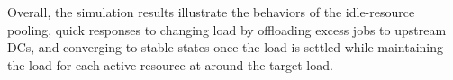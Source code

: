 

Overall, the simulation results illustrate the behaviors of the
idle-resource pooling,
quick responses to changing
load by offloading excess jobs to upstream DCs,
and converging to stable states once the load is settled
while maintaining the load for each active resource at around the target
load.

